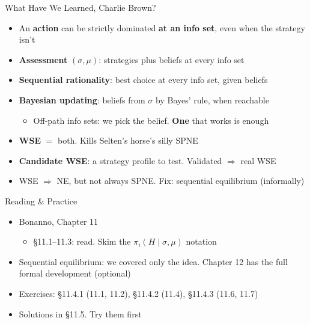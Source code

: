 \begin{frame}{What Have We Learned, Charlie Brown?}
\begin{itemize}
    \item An \textbf{action} can be strictly dominated \textbf{at an info set}, even when the strategy isn't
    \item \textbf{Assessment} $(\sigma,\mu)$: strategies plus beliefs at every info set
    \item \textbf{Sequential rationality}: best choice at every info set, given beliefs
    \item \textbf{Bayesian updating}: beliefs from $\sigma$ by Bayes' rule, when reachable
    \begin{itemize}
        \item Off-path info sets: we pick the belief. \textbf{One} that works is enough
    \end{itemize}
    \item \textbf{WSE} $=$ both. Kills Selten's horse's silly SPNE
    \item \textbf{Candidate WSE}: a strategy profile to test. Validated $\Rightarrow$ real WSE
    \item WSE $\Rightarrow$ NE, but not always SPNE. Fix: sequential equilibrium (informally)
\end{itemize}
\vfill
\vspace{-0.4in}
\end{frame}

\begin{frame}{Reading \& Practice}
\begin{itemize}
    \item Bonanno, Chapter 11
    \begin{itemize}
        \item \S11.1--11.3: read. Skim the $\pi_i(H\mid\sigma,\mu)$ notation
    \end{itemize}
    \item Sequential equilibrium: we covered only the idea. Chapter 12 has the full formal development (optional)
    \item Exercises: \S11.4.1 (11.1, 11.2), \S11.4.2 (11.4), \S11.4.3 (11.6, 11.7)
    \item Solutions in \S11.5. Try them first
\end{itemize}
\vfill
\end{frame}


